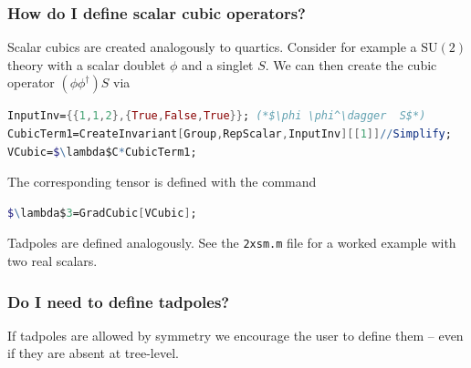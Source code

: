 \documentclass[11pt]{article}
\begin{document}
%
\subsubsection{How do I define scalar cubic operators?}
Scalar cubics are created analogously to quartics.
Consider for example
a $\mathrm{SU}(2)$ theory with
a scalar doublet $\phi$ and
a singlet $S$.
We can then create the cubic operator
$(\phi \phi^\dagger) S$ via
\begin{lstlisting}[language=Mathematica,mathescape=true]
InputInv={{1,1,2},{True,False,True}}; (*$\phi \phi^\dagger  S$*)
CubicTerm1=CreateInvariant[Group,RepScalar,InputInv][[1]]//Simplify;
VCubic=$\lambda$C*CubicTerm1;
\end{lstlisting}
The corresponding tensor is defined with the command
\begin{lstlisting}[language=Mathematica,mathescape=true]
$\lambda$3=GradCubic[VCubic];
\end{lstlisting}
Tadpoles are defined analogously.
See the
{\tt 2xsm.m}
file for a worked example with two real scalars.

%
\subsubsection{Do I need to define tadpoles?}
If tadpoles are allowed by symmetry we encourage the user to define them --
even if they are absent at tree-level.

%
\end{document}

